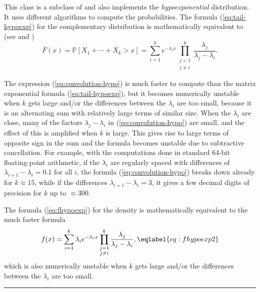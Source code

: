 
This class is a subclass of 
and also implements  the \emph{hypoexponential} distribution. It uses
different algorithms to compute the probabilities.
The formula (\ref{eq:tail-hypoexp}) for the complementary distribution
is mathematically equivalent to (see
\cite[page 299]{pROS07b} and \cite[Appendix B]{pGER10a})
\begin{equation}
\bar F(x) = \mathbb{P}\left[X_1 + \cdots + X_k > x \right]
  = \sum_{i=1}^k e^{-\lambda_i x} \prod_{\substack{j=1\\ j\not=i}}^k \frac{\lambda_j}{\lambda_
j - \lambda_i}.
\label{eq:convolution-hypo}
\end{equation}


The expression (\ref{eq:convolution-hypo}) is much faster to compute than the
matrix exponential formula (\ref{eq:tail-hypoexp}), but it becomes numerically
unstable when $k$ gets large and/or the differences between the $\lambda_i$
are too small, because it is an alternating sum with relatively large terms
of similar size. When the $\lambda_i$ are close, many of the
factors $\lambda_{j} - \lambda_{i}$ in (\ref{eq:convolution-hypo}) are small,
and the effect of this is amplified when $k$ is large. This gives rise to
large terms of opposite sign in the sum and the formula becomes unstable
due to subtractive cancellation.
%
For example, with the computations done in standard 64-bit floating-point
arithmetic, if the $\lambda_i$ are regularly spaced with differences
of $\lambda_{i+1} - \lambda_{i} = 0.1$ for all $i$, the formula
(\ref{eq:convolution-hypo}) breaks down already for $k \approx 15$, while if
the differences $\lambda_{i+1} - \lambda_{i} = 3$, it gives a few decimal
digits of precision for $k$ up to $\approx 300$.


The formula (\ref{eq:fhypoexp}) for the density is mathematically equivalent to
the much faster formula
\begin{equation}
  f(x) = \sum_{i=1}^k\lambda_i e^{-\lambda_i x}
   \prod_{\substack{j=1\\ j\not=i}}^k \frac{\lambda_j}{\lambda_j - \lambda_i},
\eqlabel{eq:fhypoexp2}
\end{equation}
which is also  numerically
unstable when $k$ gets large and/or the differences between the $\lambda_i$
are too small.


\bigskip\hrule

